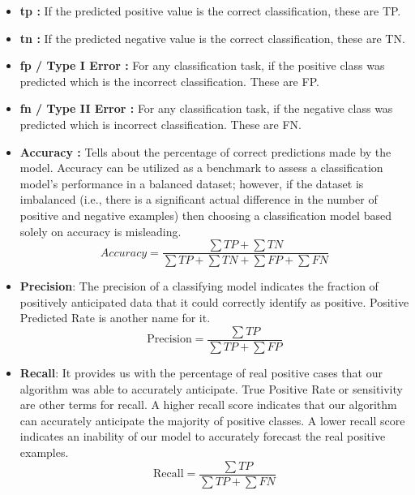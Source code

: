 \begin{itemize}
    \item \textbf{\acrfull{tp} : } If the predicted positive value is the correct classification, these are TP.
    \item \textbf{\acrfull{tn} : }  If the predicted negative value is the correct classification, these are TN.
    \item \textbf{\acrfull{fp} / Type I Error : } For any classification task, if the positive class was predicted which is the incorrect classification. These are FP.
    \item \textbf{\acrfull{fn} / Type II Error : } For any classification task, if the negative class was predicted which is incorrect classification. These are FN.
    \item \textbf{Accuracy : } Tells about the percentage of correct predictions made by the model. Accuracy can be utilized as a benchmark to assess a classification model's performance in a balanced dataset; however, if the dataset is imbalanced (i.e., there is a significant actual difference in the number of positive and negative examples) then choosing a classification model based solely on accuracy is misleading.
    \begin{equation} \label{eq:accuracy}
        Accuracy = \frac{\sum TP + \sum TN}{\sum TP + \sum TN + \sum FP + \sum FN}
    \end{equation}
    \item \textbf{Precision}: The precision of a classifying model indicates the fraction of positively anticipated data that it could correctly identify as positive. Positive Predicted Rate is another name for it.
    \begin{equation}\label{eq:precision}
        \text{Precision} = \frac{\sum TP}{\sum TP + \sum FP}
    \end{equation}
    
    \item \textbf{Recall}: It provides us with the percentage of real positive cases that our algorithm was able to accurately anticipate. True Positive Rate or sensitivity are other terms for recall. A higher recall score indicates that our algorithm can accurately anticipate the majority of positive classes. A lower recall score indicates an inability of our model to accurately forecast the real positive examples.
    \begin{equation}\label{eq:recall}
        \text{Recall} = \frac{\sum TP}{\sum TP + \sum FN}
    \end{equation}
    

\end{itemize}
